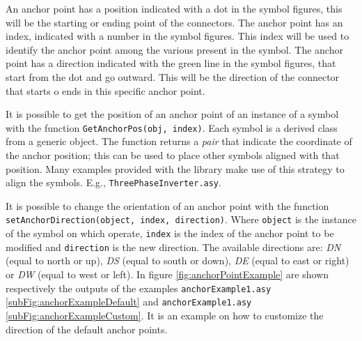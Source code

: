 \documentclass[a4paper,12pt]{report}
\begin{document}
An anchor point has a position indicated with a dot in the symbol figures, this will be the starting or ending point of the connectors. The anchor point has an index, indicated with a number in the symbol figures. This index will be used to identify the anchor point among the various present in the symbol. The anchor point has a direction indicated with the green line in the symbol figures, that start from the dot and go outward. This will be the direction of the connector that starts o ends in this specific anchor point.

It is possible to get the position of an anchor point of an instance of a symbol with the function \texttt{GetAnchorPos(obj, index)}. Each symbol is a derived class from a generic object. The function returns a \emph{pair} that indicate the coordinate of the anchor position; this can be used to place other symbols aligned with that position. Many examples provided with the library make use of this strategy to align the symbols. E.g., \texttt{ThreePhaseInverter.asy}.

It is possible to change the orientation of an anchor point with the function \texttt{setAnchorDirection(object, index, direction)}. Where \texttt{object} is the instance of the symbol on which operate, \texttt{index} is the index of the anchor point to be modified and \texttt{direction} is the new direction. The available directions are: \emph{DN} (equal to north or up), \emph{DS} (equal to south or down), \emph{DE} (equal to east or right) or \emph{DW} (equal to west or left). In figure \ref{fig:anchorPointExample} are shown respectively the outputs of the examples \texttt{anchorExample1.asy} \ref{subFig:anchorExampleDefault} and \texttt{anchorExample1.asy} \ref{subFig:anchorExampleCustom}. It is an example on how to customize the direction of the default anchor points. 
\end{document}
